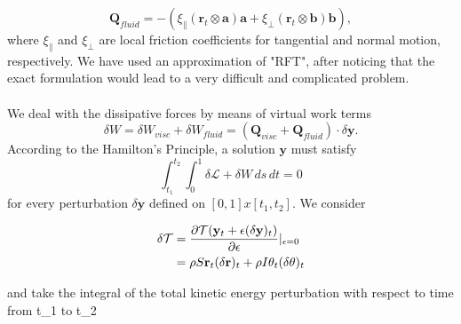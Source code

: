 \documentclass[12pt]{article}
\begin{document}
\[\mathbf{Q}_{fluid} = -( \xi_\parallel (\mathbf{r}_t\otimes\mathbf{a})\mathbf{a} + \xi_\perp (\mathbf{r}_t\otimes\mathbf{b})\mathbf{b}),
\]
where $\xi_\parallel$ and $\xi_\perp$ are local friction coefficients for tangential and normal motion, respectively.
We have used an approximation of "RFT", after noticing that the exact formulation would lead to a very difficult and complicated problem.\\\\
We deal with the dissipative forces by means of virtual work terms
\[\delta W = \delta W_{visc} + \delta W_{fluid} = (\mathbf{Q}_{visc}+\mathbf{Q}_{fluid})\cdot\delta\mathbf{y}.
\]
According to the Hamilton's Principle, a solution $\mathbf{y}$ must satisfy
\[\int_{t_1}^{t_2} \int_{0}^{1} \delta \mathcal{L}+\delta W\, ds \, dt = 0
\]
for every perturbation $\delta \mathbf{y}$ defined on $[0,1]x[t_1,t_2]$. We consider 

\begin{equation}
\begin{split}
 \delta\mathcal{T}& = \frac{\partial \mathcal{T}(\mathbf{y}_t + \epsilon (\delta \mathbf{y})_t )}{\partial{\epsilon}} \arrowvert_{\epsilon=0}\\
                  & = \rho S\mathbf{r}_t (\delta\mathbf{r})_t + \rho I \theta_t (\delta \theta)_t\\
\end{split}
\end{equation}

and take the integral of the total kinetic energy perturbation with respect to time from t_1 to t_2
\end{document}
